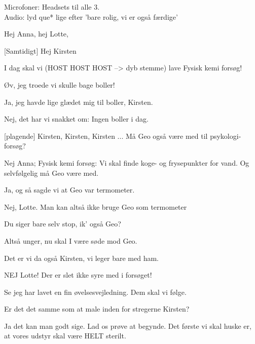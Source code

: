 \documentclass[a4paper,11pt]{article}
\begin{document}
\begin{sketch}
\scene Microfoner: Headsets til alle 3. \\ Audio: lyd que* lige efter 'bare rolig, vi er også færdige'


 Hej Anna, hej Lotte,

[Samtidigt] Hej Kirsten

 I dag skal vi (HOST HOST HOST --> dyb stemme) lave Fysisk kemi forsøg!

 Øv, jeg troede vi skulle bage boller!

 Ja, jeg havde lige glædet mig til boller, Kirsten.

 Nej, det har vi snakket om: Ingen boller i dag.

 [plagende] Kirsten, Kirsten, Kirsten ... Må Geo også være med til psykologi-forsøg?

 Nej Anna; Fysisk kemi forsøg: Vi skal finde koge- og frysepunkter for vand. Og selvfølgelig må Geo være med.


 Ja, og så sagde vi at Geo var termometer. 

 Nej, Lotte. Man kan altså ikke bruge Geo som termometer


 Du siger bare selv stop, ik’ også Geo?

 Altså unger, nu skal I være søde mod Geo.

 Det er vi da også Kirsten, vi leger bare med ham.


NEJ Lotte! Der er slet ikke syre med i forsøget!  

Se jeg har lavet en fin øvelsesvejledning. Dem skal vi følge.


 Er det det samme som at male inden for stregerne Kirsten?


 Ja det kan man godt sige. Lad os prøve at begynde. Det første vi skal huske er, at vores udstyr skal være HELT sterilt.


\end{sketch}
\end{document}
